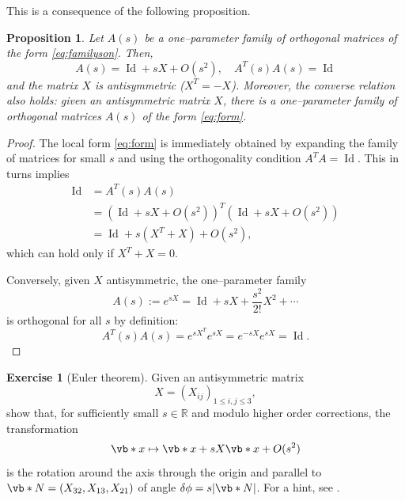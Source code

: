 \documentclass[english,fontsize=11pt,paper=b5]{scrbook}
\numberwithin{equation}{chapter}
\DeclareMathOperator{\Id}{Id}
\DeclareMathOperator{\Id}{Id}
\newtheorem{proposition}[theorem]{Proposition}
\theoremstyle{definition}
\newtheorem{exercise}{Exercise}[chapter]
\begin{document}
    This is a consequence of the following proposition.
    \begin{proposition}
      Let $A(s)$ be a one--parameter family of orthogonal matrices of the form \eqref{eq:familyson}.
      Then,
      \begin{equation}\label{eq:form}
        A(s) = \Id + sX + O(s^2), \quad A^T(s)A(s) = \Id
      \end{equation}
      and the matrix $X$ is antisymmetric ($X^T = - X$).
      Moreover, the converse relation also holds: given an antisymmetric matrix $X$, there is a one--parameter family of orthogonal matrices $A(s)$ of the form \eqref{eq:form}.
    \end{proposition}
    \begin{proof}
      The local form \eqref{eq:form} is immediately obtained by expanding the family of matrices for small $s$ and using the orthogonality condition $A^TA = \Id$.
      This in turns implies
      \begin{align}
        \Id & = A^T(s) A(s)                                                    \\
            & = \left(\Id + sX + O(s^2)\right)^T\left(\Id + sX + O(s^2)\right) \\
            & = \Id + s(X^T + X) + O(s^2),
      \end{align}
      which can hold only if $X^T + X =0$.

      Conversely, given $X$ antisymmetric, the one--parameter family
      \begin{equation}
        A(s) := e^{sX} = \Id + s X + \frac{s^2}{2!} X^2 + \cdots
      \end{equation}
      is orthogonal for all $s$ by definition:
      \begin{equation}
        A^T(s)A(s) = e^{sX^T}e^{sX} = e^{-sX} e^{sX} = \Id.
      \end{equation}
    \end{proof}

    \begin{exercise}[Euler theorem]\label{exe:rotations}
      Given an antisymmetric matrix
      \begin{equation}
        X = (X_{ij})_{1\leq i,j\leq 3},
      \end{equation}
      show that, for sufficiently small $s\in\mathbb{R}$ and modulo higher order corrections, the transformation
      \begin{equation}
        \vb*{x} \mapsto \vb*{x} + s X \vb*{x} + O(s^2)
      \end{equation}
      is the rotation around the axis through the origin and parallel to $\vb*{N}
      = (X_{32}, X_{13}, X_{21})$ of angle $\delta\phi = s|\vb*{N}|$.
      For a hint, see \cite[Chpater 26.D]{book:arnold}.
    \end{exercise}
\end{document}
